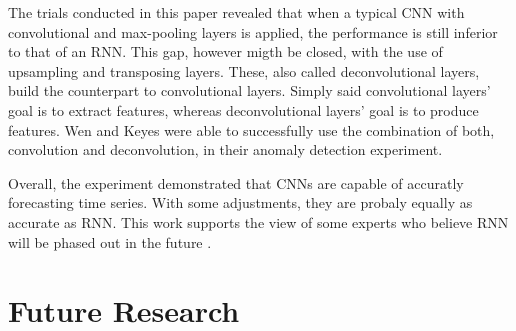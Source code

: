 The trials conducted in this paper revealed that when a typical CNN with convolutional and max-pooling layers is applied, the performance is still inferior to that of an RNN. This gap, however migth be closed, with the use of upsampling and transposing layers. These, also called deconvolutional layers, build the counterpart to convolutional layers. Simply said convolutional layers' goal is to extract features, whereas deconvolutional layers' goal is to produce features. Wen and Keyes \parencite*{Wen2019} were able to successfully use the combination of both, convolution and deconvolution, in their anomaly detection experiment.

Overall, the experiment demonstrated that CNNs are capable of accuratly forecasting time series. With some adjustments, they are probaly equally as accurate as RNN. This work supports the view of some experts who believe RNN will be phased out in the future \parencite{Culurciello2018} \parencite{Bai2018}. 

\section{Future Research}


